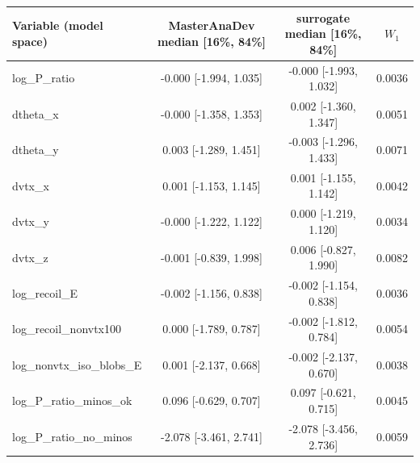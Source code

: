 \begin{tabular}{lccc}
\toprule
Variable (model space) & MasterAnaDev median [16\%, 84\%] & surrogate median [16\%, 84\%] & $W_1$ \\
\midrule
log\_P\_ratio & -0.000 [-1.994, 1.035] & -0.000 [-1.993, 1.032] & 0.0036 \\
dtheta\_x & -0.000 [-1.358, 1.353] & 0.002 [-1.360, 1.347] & 0.0051 \\
dtheta\_y & 0.003 [-1.289, 1.451] & -0.003 [-1.296, 1.433] & 0.0071 \\
dvtx\_x & 0.001 [-1.153, 1.145] & 0.001 [-1.155, 1.142] & 0.0042 \\
dvtx\_y & -0.000 [-1.222, 1.122] & 0.000 [-1.219, 1.120] & 0.0034 \\
dvtx\_z & -0.001 [-0.839, 1.998] & 0.006 [-0.827, 1.990] & 0.0082 \\
log\_recoil\_E & -0.002 [-1.156, 0.838] & -0.002 [-1.154, 0.838] & 0.0036 \\
log\_recoil\_nonvtx100 & 0.000 [-1.789, 0.787] & -0.002 [-1.812, 0.784] & 0.0054 \\
log\_nonvtx\_iso\_blobs\_E & 0.001 [-2.137, 0.668] & -0.002 [-2.137, 0.670] & 0.0038 \\
log\_P\_ratio\_minos\_ok & 0.096 [-0.629, 0.707] & 0.097 [-0.621, 0.715] & 0.0045 \\
log\_P\_ratio\_no\_minos & -2.078 [-3.461, 2.741] & -2.078 [-3.456, 2.736] & 0.0059 \\
\bottomrule
\end{tabular}

